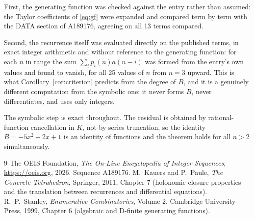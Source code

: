 \documentclass[11pt,a4paper]{article}
\theoremstyle{plain}
\theoremstyle{definition}
\begin{document}
First, the generating function was checked against the entry rather than assumed: the
Taylor coefficients of \eqref{eq:gf} were expanded and compared term by term with the DATA
section of A189176, agreeing on all 13 terms compared.

Second, the recurrence itself was evaluated directly on the published terms, in exact
integer arithmetic and without reference to the generating function: for each $n$ in range
the sum $\sum_{i}p_{i}(n)a(n-i)$ was formed from the entry's own values and found to
vanish, for all 25 values of $n$ from $n=3$ upward. This is what
Corollary~\ref{cor:criterion} predicts from the degree of $B$, and it is a genuinely
different computation from the symbolic one: it never forms $B$, never differentiates, and
uses only integers.

The symbolic step is exact throughout. The residual is obtained by rational-function
cancellation in $K$, not by series truncation, so the identity $B=- 5 x^{2} - 2 x + 1$ is an
identity of functions and the theorem holds for all $n>2$ simultaneously.

\begin{thebibliography}{9}
 The OEIS Foundation, \emph{The On-Line Encyclopedia of Integer Sequences},
\url{https://oeis.org}, 2026. Sequence A189176.
 M.~Kauers and P.~Paule, \emph{The Concrete Tetrahedron}, Springer, 2011,
Chapter 7 (holonomic closure properties and the translation between recurrences and
differential equations).
 R.~P.~Stanley, \emph{Enumerative Combinatorics}, Volume 2, Cambridge
University Press, 1999, Chapter 6 (algebraic and D-finite generating functions).
\end{thebibliography}
\end{document}
